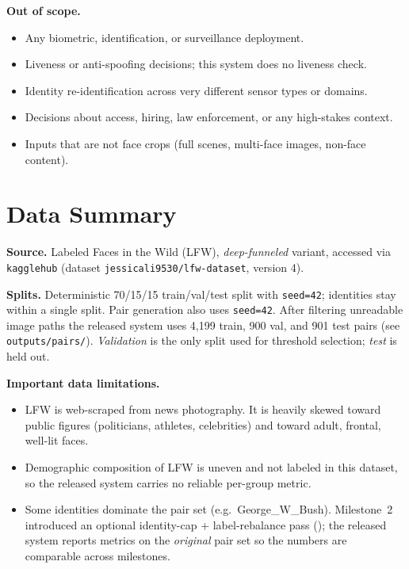 \documentclass[11pt]{article}
\newcommand{\fpath}[1]{\path{#1}}
\begin{document}
\textbf{Out of scope.}
\begin{itemize}[noitemsep, leftmargin=*]
    \item Any biometric, identification, or surveillance deployment.
    \item Liveness or anti-spoofing decisions; this system does no liveness check.
    \item Identity re-identification across very different sensor types or domains.
    \item Decisions about access, hiring, law enforcement, or any high-stakes context.
    \item Inputs that are not face crops (full scenes, multi-face images, non-face content).
\end{itemize}

\section{Data Summary}
\textbf{Source.} Labeled Faces in the Wild (LFW), \emph{deep-funneled} variant, accessed via
\texttt{kagglehub} (dataset \texttt{jessicali9530/lfw-dataset}, version 4).

\textbf{Splits.} Deterministic 70/15/15 train/val/test split with \texttt{seed=42}; identities
stay within a single split. Pair generation also uses \texttt{seed=42}. After filtering
unreadable image paths the released system uses 4{,}199 train, 900 val, and 901 test pairs
(see \texttt{outputs/pairs/}). \emph{Validation} is the only split used for threshold
selection; \emph{test} is held out.

\textbf{Important data limitations.}
\begin{itemize}[noitemsep, leftmargin=*]
    \item LFW is web-scraped from news photography. It is heavily skewed toward
    public figures (politicians, athletes, celebrities) and toward adult, frontal,
    well-lit faces.
    \item Demographic composition of LFW is uneven and not labeled in this dataset, so
    the released system carries no reliable per-group metric.
    \item Some identities dominate the pair set (e.g.\ George\_W\_Bush). Milestone~2
    introduced an optional identity-cap + label-rebalance pass
    (\fpath{outputs/pairs_improved/}); the released system reports metrics on the
    \emph{original} pair set so the numbers are comparable across milestones.
\end{itemize}
\end{document}
